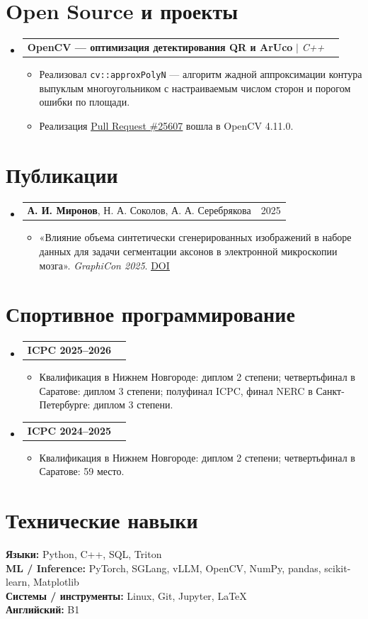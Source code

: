 \documentclass[letterpaper,10pt]{article}
\makeatletter
\newcommand{\resumeItem}[1]{\item\small{#1\vspace{-1pt}}}
\newcommand{\resumeProjectHeading}[2]{
  \item
  \begin{tabular*}{0.98\textwidth}{l@{\extracolsep{\fill}}r}
    \small #1 & \small #2 \\
  \end{tabular*}\vspace{-6pt}
}
\newcommand{\resumeSubHeadingListStart}{\begin{itemize}[leftmargin=0.14in,label={}]}
\newcommand{\resumeSubHeadingListEnd}{\end{itemize}}
\newcommand{\resumeItemListStart}{\begin{itemize}[leftmargin=0.22in,itemsep=1pt,topsep=2pt]}
\newcommand{\resumeItemListEnd}{\end{itemize}\vspace{-5pt}}
\makeatother
\begin{document}
\section{Open Source и проекты}
\resumeSubHeadingListStart
  \resumeProjectHeading
    {\textbf{OpenCV --- оптимизация детектирования QR и ArUco} $|$ \emph{C++}}{}
  \resumeItemListStart
    \resumeItem{Реализовал \texttt{cv::approxPolyN} --- алгоритм жадной аппроксимации контура выпуклым многоугольником с настраиваемым числом сторон и порогом ошибки по площади.}
    \resumeItem{Реализация \href{https://github.com/opencv/opencv/pull/25607}{\underline{Pull Request \#25607}} вошла в OpenCV 4.11.0.}
  \resumeItemListEnd
\resumeSubHeadingListEnd

\section{Публикации}
\resumeSubHeadingListStart
  \resumeProjectHeading
    {\textbf{А. И. Миронов}, Н. А. Соколов, А. А. Серебрякова}{2025}
  \resumeItemListStart
    \resumeItem{«Влияние объема синтетически сгенерированных изображений в наборе данных для задачи сегментации аксонов в электронной микроскопии мозга». \textit{GraphiCon 2025}. \href{https://doi.org/10.25686/978-5-8158-2474-4-2025-828-834}{\underline{DOI}}}
  \resumeItemListEnd
\resumeSubHeadingListEnd

\section{Спортивное программирование}
\resumeSubHeadingListStart
  \resumeProjectHeading{\textbf{ICPC 2025--2026}}{}
  \resumeItemListStart
    \resumeItem{Квалификация в Нижнем Новгороде: диплом 2 степени; четвертьфинал в Саратове: диплом 3 степени; полуфинал ICPC, финал NERC в Санкт-Петербурге: диплом 3 степени.}
  \resumeItemListEnd
  \resumeProjectHeading{\textbf{ICPC 2024--2025}}{}
  \resumeItemListStart
    \resumeItem{Квалификация в Нижнем Новгороде: диплом 2 степени; четвертьфинал в Саратове: 59 место.}
  \resumeItemListEnd
\resumeSubHeadingListEnd

\section{Технические навыки}
\begin{itemize}[leftmargin=0.14in,label={}]
  \small{\item{
    \textbf{Языки:} Python, C++, SQL, Triton \\
    \textbf{ML / Inference:} PyTorch, SGLang, vLLM, OpenCV, NumPy, pandas, scikit-learn, Matplotlib \\
    \textbf{Системы / инструменты:} Linux, Git, Jupyter, LaTeX \\
    \textbf{Английский:} B1
  }}
\end{itemize}
\end{document}
